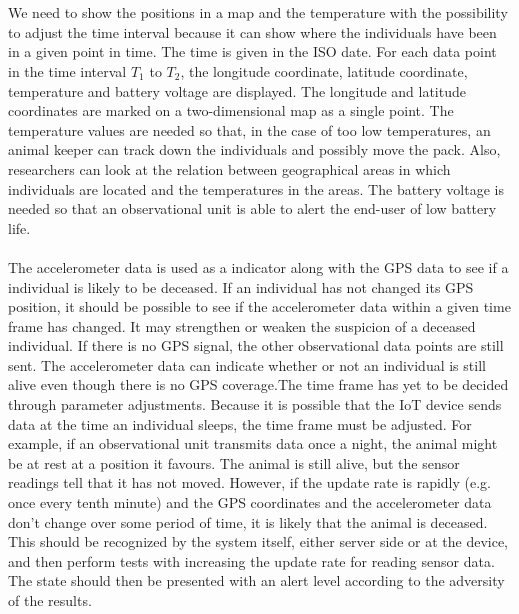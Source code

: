 		\\\\
		We need to show the positions in a map and the temperature with the possibility to adjust the time interval because it can show where the individuals have been in a given point in time. The time is given in the ISO date. For each data point in the time interval $T_1$ to $T_2$, the longitude coordinate, latitude coordinate, temperature and battery voltage are displayed. The longitude and latitude coordinates are marked on a two-dimensional map as a single point. The temperature values are needed so that, in the case of too low temperatures, an animal keeper can track down the individuals and possibly move the pack. Also, researchers can look at the relation between geographical areas in which individuals are located and the temperatures in the areas. The battery voltage is needed so that an observational unit is able to alert the end-user of low battery life.  	
		\\\\
		The accelerometer data is used as a indicator along with the GPS data to see if a individual is likely to be deceased. If an individual has not changed its GPS position, it should be possible to see if the accelerometer data within a given time frame has changed. It may strengthen or weaken the suspicion of a deceased individual. If there is no GPS signal, the other observational data points are still sent. The accelerometer data can indicate whether or not an individual is still alive even though there is no GPS coverage.The time frame has yet to be decided through parameter adjustments. Because it is possible that the IoT device sends data at the time an individual sleeps, the time frame must be adjusted. For example, if an observational unit transmits data once a night, the animal might be at rest at a 
		position it favours. The animal is still alive, but the sensor readings tell that it has not moved. However, if the update rate is rapidly (e.g. once every tenth minute) and the GPS coordinates and the accelerometer data don’t change over some period of time, it is likely that the animal is deceased. This should be recognized by the system itself, either server side or at the device, and then perform tests with increasing the update rate for reading sensor data. The state should then be presented with an alert level according to the adversity of the results.
		\\\\
